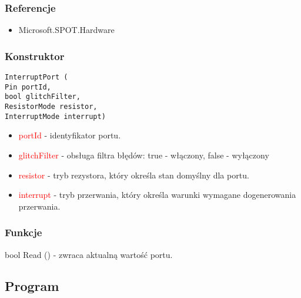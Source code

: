 \documentclass{article}
\begin{document}
\subsubsection{Referencje}
\begin{itemize}
\item Microsoft.SPOT.Hardware
\end{itemize}
\subsubsection{Konstruktor}
\begin{lstlisting}[frame=single] 
InterruptPort (
Pin portId, 
bool glitchFilter,
ResistorMode resistor,
InterruptMode interrupt)
\end{lstlisting}

\begin{itemize}
\item \textcolor{red}{portId} - identyfikator portu.
\item \textcolor{red}{glitchFilter} - obsługa filtra błędów: true - włączony, false - wyłączony
\item \textcolor{red}{resistor} - tryb rezystora, który określa stan domyślny dla portu.
\item \textcolor{red}{interrupt} - tryb przerwania, który określa warunki wymagane do\newline generowania przerwania.
\end{itemize}
\subsubsection{Funkcje}
bool Read () - zwraca aktualną wartość portu.
\subsection{Program}
\end{document}
